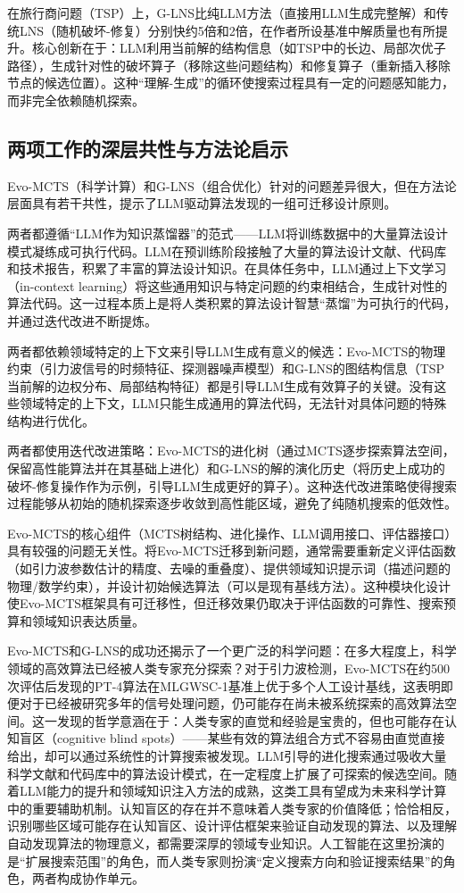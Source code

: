 在旅行商问题（TSP）上，G-LNS比纯LLM方法（直接用LLM生成完整解）和传统LNS（随机破坏-修复）分别快约5倍和2倍，在作者所设基准中解质量也有所提升。核心创新在于：LLM利用当前解的结构信息（如TSP中的长边、局部次优子路径），生成针对性的破坏算子（移除这些问题结构）和修复算子（重新插入移除节点的候选位置）。这种“理解-生成”的循环使搜索过程具有一定的问题感知能力，而非完全依赖随机探索。

\subsection{两项工作的深层共性与方法论启示}

Evo-MCTS（科学计算）和G-LNS（组合优化）针对的问题差异很大，但在方法论层面具有若干共性，提示了LLM驱动算法发现的一组可迁移设计原则。

两者都遵循“LLM作为知识蒸馏器”的范式——LLM将训练数据中的大量算法设计模式凝练成可执行代码。LLM在预训练阶段接触了大量的算法设计文献、代码库和技术报告，积累了丰富的算法设计知识。在具体任务中，LLM通过上下文学习（in-context learning）将这些通用知识与特定问题的约束相结合，生成针对性的算法代码。这一过程本质上是将人类积累的算法设计智慧“蒸馏”为可执行的代码，并通过迭代改进不断提炼。

两者都依赖领域特定的上下文来引导LLM生成有意义的候选：Evo-MCTS的物理约束（引力波信号的时频特征、探测器噪声模型）和G-LNS的图结构信息（TSP当前解的边权分布、局部结构特征）都是引导LLM生成有效算子的关键。没有这些领域特定的上下文，LLM只能生成通用的算法代码，无法针对具体问题的特殊结构进行优化。

两者都使用迭代改进策略：Evo-MCTS的进化树（通过MCTS逐步探索算法空间，保留高性能算法并在其基础上进化）和G-LNS的解的演化历史（将历史上成功的破坏-修复操作作为示例，引导LLM生成更好的算子）。这种迭代改进策略使得搜索过程能够从初始的随机探索逐步收敛到高性能区域，避免了纯随机搜索的低效性。

Evo-MCTS的核心组件（MCTS树结构、进化操作、LLM调用接口、评估器接口）具有较强的问题无关性。将Evo-MCTS迁移到新问题，通常需要重新定义评估函数（如引力波参数估计的精度、去噪的重叠度）、提供领域知识提示词（描述问题的物理/数学约束），并设计初始候选算法（可以是现有基线方法）。这种模块化设计使Evo-MCTS框架具有可迁移性，但迁移效果仍取决于评估函数的可靠性、搜索预算和领域知识表达质量。

Evo-MCTS和G-LNS的成功还揭示了一个更广泛的科学问题：在多大程度上，科学领域的高效算法已经被人类专家充分探索？对于引力波检测，Evo-MCTS在约500次评估后发现的PT-4算法在MLGWSC-1基准上优于多个人工设计基线，这表明即便对于已经被研究多年的信号处理问题，仍可能存在尚未被系统探索的高效算法空间。这一发现的哲学意涵在于：人类专家的直觉和经验是宝贵的，但也可能存在认知盲区（cognitive blind spots）——某些有效的算法组合方式不容易由直觉直接给出，却可以通过系统性的计算搜索被发现。LLM引导的进化搜索通过吸收大量科学文献和代码库中的算法设计模式，在一定程度上扩展了可探索的候选空间。随着LLM能力的提升和领域知识注入方法的成熟，这类工具有望成为未来科学计算中的重要辅助机制。认知盲区的存在并不意味着人类专家的价值降低；恰恰相反，识别哪些区域可能存在认知盲区、设计评估框架来验证自动发现的算法、以及理解自动发现算法的物理意义，都需要深厚的领域专业知识。人工智能在这里扮演的是“扩展搜索范围”的角色，而人类专家则扮演“定义搜索方向和验证搜索结果”的角色，两者构成协作单元。


